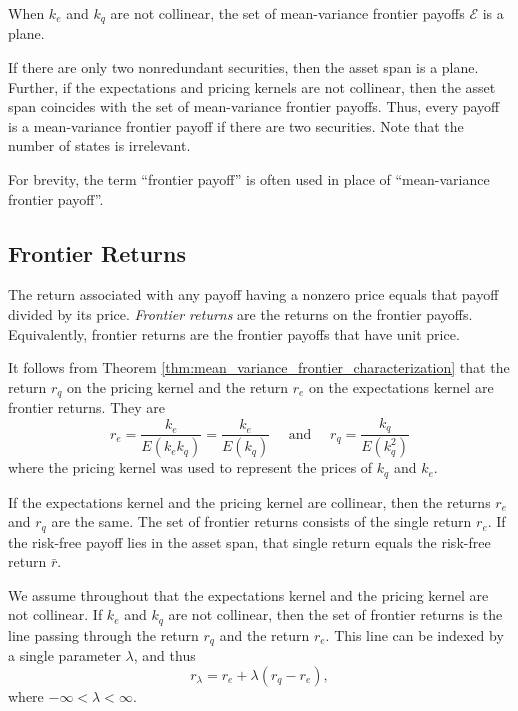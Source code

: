 \documentclass[\topdir/lecture\_notes.tex]{subfiles}
\begin{document}
When $k_{e}$ and $k_{q}$ are not collinear, the set of mean-variance frontier payoffs $\mathcal{E}$ is a plane.

If there are only two nonredundant securities, then the asset span is a plane. Further, if the expectations and pricing kernels are not collinear, then the asset span coincides with the set of mean-variance frontier payoffs. Thus, every payoff is a mean-variance frontier payoff if there are two securities. Note that the number of states is irrelevant.

For brevity, the term ``frontier payoff'' is often used in place of ``mean-variance frontier payoff''.

\subsection{Frontier Returns}
The return associated with any payoff having a nonzero price equals that payoff divided by its price. \emph{Frontier returns} are the returns on the frontier payoffs. Equivalently, frontier returns are the frontier payoffs that have unit price.



It follows from Theorem \ref{thm:mean_variance_frontier_characterization} that the return $r_{q}$ on the pricing kernel and the return $r_{e}$ on the expectations kernel are frontier returns. They are
\begin{equation*}
r_{e}=\frac{k_{e}}{E\left(k_{e} k_{q}\right)}=\frac{k_{e}}{E\left(k_{q}\right)} \quad \text { and } \quad r_{q}=\frac{k_{q}}{E\left(k_{q}^{2}\right)} 
\end{equation*}
where the pricing kernel was used to represent the prices of $k_{q}$ and $k_{e}$.

If the expectations kernel and the pricing kernel are collinear, then the returns $r_{e}$ and $r_{q}$ are the same. The set of frontier returns consists of the single return $r_{e}$. If the risk-free payoff lies in the asset span, that single return equals the risk-free return $\bar{r}$.

We assume throughout that the expectations kernel and the pricing kernel are not collinear. If $k_{e}$ and $k_{q}$ are not collinear, then the set of frontier returns is the line passing through the return $r_{q}$ and the return $r_{e}$. This line can be indexed by a single parameter $\lambda$, and thus
\begin{equation*}
r_{\lambda}=r_{e}+\lambda\left(r_{q}-r_{e}\right), \label{eq:frontier_return_parametrization} 
\end{equation*}
where $-\infty<\lambda<\infty$.
\end{document}

